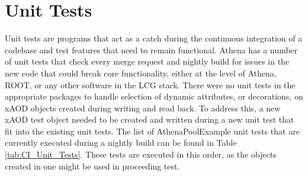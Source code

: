 \section{Unit Tests}
\label{sec:Mod_utests_CI}
Unit tests are programs that act as a catch during the continuous integration of a codebase and test features that need to remain functional. 
Athena has a number of unit tests that check every merge request and nightly build for issues in the new code that could break core functionality, either at the level of Athena, ROOT, or any other software in the LCG stack.
There were no unit tests in the appropriate packages to handle selection of dynamic attributes, or decorations, on xAOD objects created during writing and read back.
To address this, a new xAOD test object needed to be created and written during a new unit test that fit into the existing unit tests.
The list of AthenaPoolExample unit tests that are currently executed during a nightly build can be found in Table \ref{tab:CI_Unit_Tests}.
These tests are executed in this order, as the objects created in one might be used in proceeding test.

\begin{table}[h]
    \centering
    \caption{List of unit tests in the AthenaPoolExample package that are currently executed during a nightly build. The unit tests marked by the `*' are the tests produced for this thesis.}
    \label{tab:CI_Unit_Tests}
\end{table}

